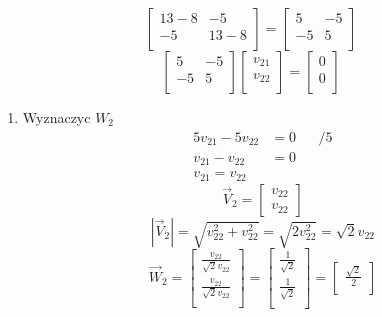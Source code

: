 \documentclass[11pt]{article}
\begin{document}
\begin{enumerate}
\begin{enumerate}
\[\begin{bmatrix}
  13 - 8 & -5\\
  -5 & 13 - 8\\
\end{bmatrix}
=
\begin{bmatrix}
  5 & -5\\
  -5 & 5\\
\end{bmatrix}\]
\[\begin{bmatrix}
    5 & -5\\
    -5 & 5\\
  \end{bmatrix}
  \begin{bmatrix}
    v_{21}\\
    v_{22}\\
  \end{bmatrix} = \begin{bmatrix}
                    0\\
                    0\\
                  \end{bmatrix}\]
\begin{enumerate}
\item Wyznaczyc \(W_{2}\)
\label{sec:orgc6a9f89}
\begin{align*}
  5 v_{21} - 5 v_{22} &= 0 && / 5\\
  v_{21} - v_{22} &= 0 \\
  v_{21} = v_{22}
\end{align*}
\[\vec V_{2} = \begin{bmatrix}
                 v_{22}\\
                 v_{22}
               \end{bmatrix}\]
\[| \vec V_{2} | = \sqrt{ v_{22}^{2} + v_{22}^{2}}
  = \sqrt{2 v_{22}^{2}}
  = \sqrt{2} v_{22}\]
\[\vec W_2 = \begin{bmatrix}
               \displaystyle\frac{v_{22}}{\sqrt{2} v_{22}}\\
               \displaystyle\frac{v_{22}}{\sqrt{2} v_{22}}\\
             \end{bmatrix}
             = \begin{bmatrix}
                 \frac{1}{\sqrt{2}}\\
                 \frac{1}{\sqrt{2}}\\
               \end{bmatrix}
               = \begin{bmatrix}
                   \frac{\sqrt{2}}{2}\\

\end{bmatrix}\]
\end{enumerate}
\end{enumerate}
\end{enumerate}
\end{document}
